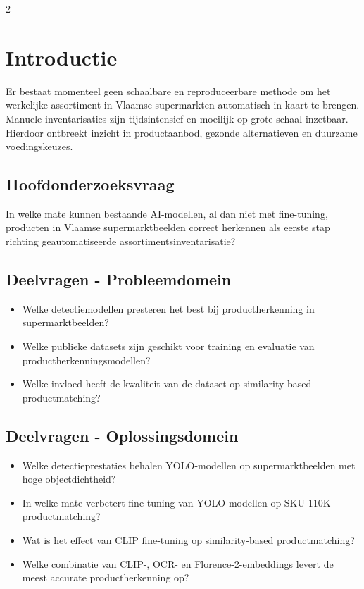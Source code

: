 \documentclass[a0,portrait]{hogent-poster}
\begin{document}
\begin{multicols}{2} %

\section{Introductie}

Er bestaat momenteel geen schaalbare en reproduceerbare methode om het werkelijke assortiment in Vlaamse supermarkten automatisch in kaart te brengen. Manuele inventarisaties zijn tijdsintensief en moeilijk op grote schaal inzetbaar. Hierdoor ontbreekt inzicht in productaanbod, gezonde alternatieven en duurzame voedingskeuzes.

\subsection{Hoofdonderzoeksvraag}

In welke mate kunnen bestaande AI-modellen, al dan niet met fine-tuning, producten in Vlaamse supermarktbeelden correct herkennen als eerste stap richting geautomatiseerde assortimentsinventarisatie?

\subsection{Deelvragen - Probleemdomein}
\begin{itemize}
    \setlength{\itemsep}{0pt}
    \setlength{\parskip}{0pt}

    \item Welke detectiemodellen presteren het best bij productherkenning in supermarktbeelden?
    \item Welke publieke datasets zijn geschikt voor training en evaluatie van productherkenningsmodellen?
    \item Welke invloed heeft de kwaliteit van de dataset op similarity-based productmatching?
\end{itemize}

\subsection{Deelvragen - Oplossingsdomein}
\begin{itemize}
    \setlength{\itemsep}{0pt}
    \setlength{\parskip}{0pt}

    \item Welke detectieprestaties behalen YOLO-modellen op supermarktbeelden met hoge objectdichtheid?
    \item In welke mate verbetert fine-tuning van YOLO-modellen op SKU-110K productmatching?
    \item Wat is het effect van CLIP fine-tuning op similarity-based productmatching?
    \item Welke combinatie van CLIP-, OCR- en Florence-2-embeddings levert de meest accurate productherkenning op?
\end{itemize}


\end{multicols}
\end{document}

